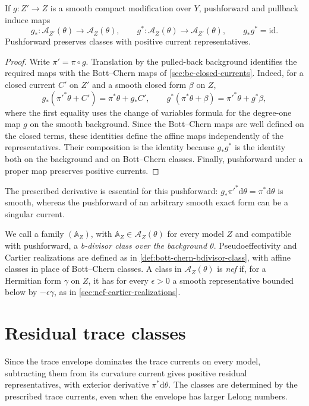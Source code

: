 \begin{proposition}\label{prop:fixed-background-class-maps}
If $g\colon Z'\to Z$ is a smooth compact modification over $Y$, pushforward and pullback induce maps
\[
 g_*\colon\mathscr A_{Z'}(\theta)\to\mathscr A_Z(\theta),
 \qquad g^*\colon\mathscr A_Z(\theta)\to\mathscr A_{Z'}(\theta),
 \qquad g_*g^*=\mathrm{id}.
\]
Pushforward preserves classes with positive current representatives.
\end{proposition}
\begin{proof}
Write $\pi'=\pi\circ g$. Translation by the pulled-back background identifies the required maps with the Bott--Chern maps of \cref{sec:bc-closed-currents}. Indeed, for a closed current $C'$ on $Z'$ and a smooth closed form $\beta$ on $Z$,
\[
 g_*(\pi'^*\theta+C')=\pi^*\theta+g_*C',\qquad
 g^*(\pi^*\theta+\beta)=\pi'^*\theta+g^*\beta,
\]
where the first equality uses the change of variables formula for the degree-one map $g$ on the smooth background. Since the Bott--Chern maps are well defined on the closed terms, these identities define the affine maps independently of the representatives. Their composition is the identity because $g_*g^*$ is the identity both on the background and on Bott--Chern classes. Finally, pushforward under a proper map preserves positive currents.
\end{proof}

The prescribed derivative is essential for this pushforward: $g_*\pi'^*\mathrm{d}\theta=\pi^*\mathrm{d}\theta$ is smooth, whereas the pushforward of an arbitrary smooth exact form can be a singular current.

We call a family $(\mathbb A_Z)$, with $\mathbb A_Z\in\mathscr A_Z(\theta)$ for every model $Z$ and compatible with pushforward, a \emph{b-divisor class over the background $\theta$}. Pseudoeffectivity and Cartier realizations are defined as in \cref{def:bott-chern-bdivisor-class}, with affine classes in place of Bott--Chern classes. A class in $\mathscr A_Z(\theta)$ is \emph{nef} if, for a Hermitian form $\gamma$ on $Z$, it has for every $\epsilon>0$ a smooth representative bounded below by $-\epsilon\gamma$, as in \cref{sec:nef-cartier-realizations}.

\section{Residual trace classes}\label{sec:affine-trace-class}

Since the trace envelope dominates the trace currents on every model, subtracting them from its curvature current gives positive residual representatives, with exterior derivative $\pi^*\mathrm{d}\theta$. The classes are determined by the prescribed trace currents, even when the envelope has larger Lelong numbers.

